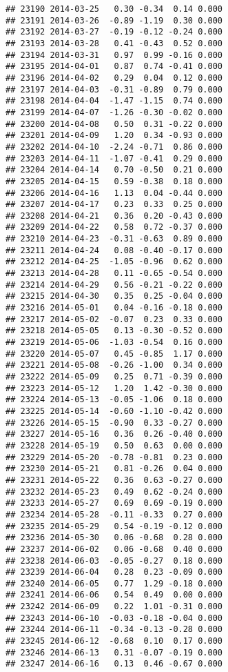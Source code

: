 \documentclass[
]{article}
\begin{document}
\begin{verbatim}
## 23190 2014-03-25   0.30 -0.34  0.14 0.000
## 23191 2014-03-26  -0.89 -1.19  0.30 0.000
## 23192 2014-03-27  -0.19 -0.12 -0.24 0.000
## 23193 2014-03-28   0.41 -0.43  0.52 0.000
## 23194 2014-03-31   0.97  0.99 -0.16 0.000
## 23195 2014-04-01   0.87  0.74 -0.41 0.000
## 23196 2014-04-02   0.29  0.04  0.12 0.000
## 23197 2014-04-03  -0.31 -0.89  0.79 0.000
## 23198 2014-04-04  -1.47 -1.15  0.74 0.000
## 23199 2014-04-07  -1.26 -0.30 -0.02 0.000
## 23200 2014-04-08   0.50  0.31 -0.22 0.000
## 23201 2014-04-09   1.20  0.34 -0.93 0.000
## 23202 2014-04-10  -2.24 -0.71  0.86 0.000
## 23203 2014-04-11  -1.07 -0.41  0.29 0.000
## 23204 2014-04-14   0.70 -0.50  0.21 0.000
## 23205 2014-04-15   0.59 -0.38  0.18 0.000
## 23206 2014-04-16   1.13  0.04 -0.44 0.000
## 23207 2014-04-17   0.23  0.33  0.25 0.000
## 23208 2014-04-21   0.36  0.20 -0.43 0.000
## 23209 2014-04-22   0.58  0.72 -0.37 0.000
## 23210 2014-04-23  -0.31 -0.63  0.89 0.000
## 23211 2014-04-24   0.08 -0.40 -0.17 0.000
## 23212 2014-04-25  -1.05 -0.96  0.62 0.000
## 23213 2014-04-28   0.11 -0.65 -0.54 0.000
## 23214 2014-04-29   0.56 -0.21 -0.22 0.000
## 23215 2014-04-30   0.35  0.25 -0.04 0.000
## 23216 2014-05-01   0.04 -0.16 -0.18 0.000
## 23217 2014-05-02  -0.07  0.23  0.33 0.000
## 23218 2014-05-05   0.13 -0.30 -0.52 0.000
## 23219 2014-05-06  -1.03 -0.54  0.16 0.000
## 23220 2014-05-07   0.45 -0.85  1.17 0.000
## 23221 2014-05-08  -0.26 -1.00  0.34 0.000
## 23222 2014-05-09   0.25  0.71 -0.39 0.000
## 23223 2014-05-12   1.20  1.42 -0.30 0.000
## 23224 2014-05-13  -0.05 -1.06  0.18 0.000
## 23225 2014-05-14  -0.60 -1.10 -0.42 0.000
## 23226 2014-05-15  -0.90  0.33 -0.27 0.000
## 23227 2014-05-16   0.36  0.26 -0.40 0.000
## 23228 2014-05-19   0.50  0.63  0.00 0.000
## 23229 2014-05-20  -0.78 -0.81  0.23 0.000
## 23230 2014-05-21   0.81 -0.26  0.04 0.000
## 23231 2014-05-22   0.36  0.63 -0.27 0.000
## 23232 2014-05-23   0.49  0.62 -0.24 0.000
## 23233 2014-05-27   0.69  0.69 -0.19 0.000
## 23234 2014-05-28  -0.11 -0.33  0.27 0.000
## 23235 2014-05-29   0.54 -0.19 -0.12 0.000
## 23236 2014-05-30   0.06 -0.68  0.28 0.000
## 23237 2014-06-02   0.06 -0.68  0.40 0.000
## 23238 2014-06-03  -0.05 -0.27  0.18 0.000
## 23239 2014-06-04   0.28  0.23 -0.09 0.000
## 23240 2014-06-05   0.77  1.29 -0.18 0.000
## 23241 2014-06-06   0.54  0.49  0.00 0.000
## 23242 2014-06-09   0.22  1.01 -0.31 0.000
## 23243 2014-06-10  -0.03 -0.18 -0.04 0.000
## 23244 2014-06-11  -0.34 -0.13 -0.28 0.000
## 23245 2014-06-12  -0.68  0.10  0.17 0.000
## 23246 2014-06-13   0.31 -0.07 -0.19 0.000
## 23247 2014-06-16   0.13  0.46 -0.67 0.000

\end{verbatim}
\end{document}
